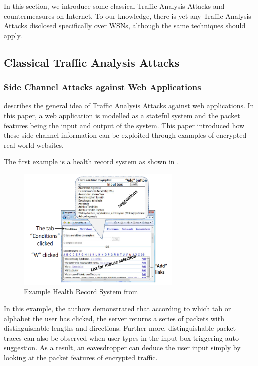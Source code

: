 In this section, we introduce some classical Traffic Analysis Attacks and countermeasures on Internet. To our knowledge, there is yet any Traffic Analysis Attacks disclosed specifically over WSNs, although the same techniques should apply.

\subsection{Classical Traffic Analysis Attacks} \label{Subsec: Traffic Analysis Attacks}

\subsubsection{Side Channel Attacks against Web Applications}

\cite{WebSideChannel} describes the general idea of Traffic Analysis Attacks against web applications. In this paper, a web application is modelled as a stateful system and the packet features being the input and output of the system. This paper introduced how these side channel information can be exploited through examples of encrypted real world websites.

\begin{example}
	The first example is a health record system as shown in .
	
	\begin{figure}[ht!]
		\center
		\includegraphics[width=0.7\textwidth]{fig/WebSideChannelExample1.png}
		\caption{Example Health Record System from \cite{WebSideChannel}}
		\label{Fig: HealthRecordSystem}
	\end{figure}
	
	In this example, the authors demonstrated that according to which tab or alphabet the user has clicked, the server returns a series of  packets with distinguishable lengths and directions. Further more, distinguishable packet traces can also be observed when user types in the input box triggering auto suggestion. As a result, an eavesdropper can deduce the user input simply by looking at the packet features of encrypted traffic.
\end{example}

